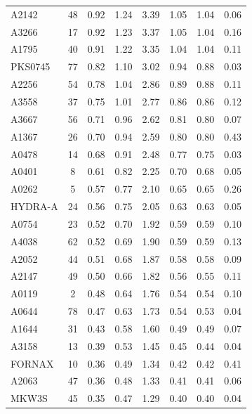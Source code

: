 \documentclass[10pt,aps,pra,reprint,amsmath,amsfonts,amssymb,showpacs,nofootinbib,floatfix]{revtex4-1}
\newcommand{\vstt}{\vspace{-0.0mm}}
\begin{document}
{\begin{table}
\begin{minipage}{2.0\columnwidth}
\begin{tabular}{l c c c c c c c}
A2142    &  48 &   0.92 &   1.24 &   3.39 &   1.05 &   1.04 &   0.06 \vstt \\
A3266    &  17 &   0.92 &   1.23 &   3.37 &   1.05 &   1.04 &   0.16 \vstt \\
A1795    &  40 &   0.91 &   1.22 &   3.35 &   1.04 &   1.04 &   0.11 \vstt \\
PKS0745  &  77 &   0.82 &   1.10 &   3.02 &   0.94 &   0.88 &   0.03 \vstt \\
A2256    &  54 &   0.78 &   1.04 &   2.86 &   0.89 &   0.88 &   0.11 \vstt \\
A3558    &  37 &   0.75 &   1.01 &   2.77 &   0.86 &   0.86 &   0.12 \vstt \\
A3667    &  56 &   0.71 &   0.96 &   2.62 &   0.81 &   0.80 &   0.07 \vstt \\
A1367    &  26 &   0.70 &   0.94 &   2.59 &   0.80 &   0.80 &   0.43 \vstt \\
A0478    &  14 &   0.68 &   0.91 &   2.48 &   0.77 &   0.75 &   0.03 \vstt \\
A0401    &   8 &   0.61 &   0.82 &   2.25 &   0.70 &   0.68 &   0.05 \vstt \\
A0262    &   5 &   0.57 &   0.77 &   2.10 &   0.65 &   0.65 &   0.26 \vstt \\
HYDRA-A  &  24 &   0.56 &   0.75 &   2.05 &   0.63 &   0.63 &   0.05 \vstt \\
A0754    &  23 &   0.52 &   0.70 &   1.92 &   0.59 &   0.59 &   0.10 \vstt \\
A4038    &  62 &   0.52 &   0.69 &   1.90 &   0.59 &   0.59 &   0.13 \vstt \\
A2052    &  44 &   0.51 &   0.68 &   1.87 &   0.58 &   0.58 &   0.09 \vstt \\
A2147    &  49 &   0.50 &   0.66 &   1.82 &   0.56 &   0.55 &   0.11 \vstt \\
A0119    &   2 &   0.48 &   0.64 &   1.76 &   0.54 &   0.54 &   0.10 \vstt \\
A0644    &  78 &   0.47 &   0.63 &   1.73 &   0.54 &   0.53 &   0.04 \vstt \\
A1644    &  31 &   0.43 &   0.58 &   1.60 &   0.49 &   0.49 &   0.07 \vstt \\
A3158    &  13 &   0.39 &   0.53 &   1.45 &   0.45 &   0.44 &   0.04 \vstt \\
FORNAX   &  10 &   0.36 &   0.49 &   1.34 &   0.42 &   0.42 &   0.41 \vstt \\
A2063    &  47 &   0.36 &   0.48 &   1.33 &   0.41 &   0.41 &   0.06 \vstt \\
MKW3S    &  45 &   0.35 &   0.47 &   1.29 &   0.40 &   0.40 &   0.04 \vstt \\

\end{tabular}
\end{minipage}
\end{table}}
\end{document}

